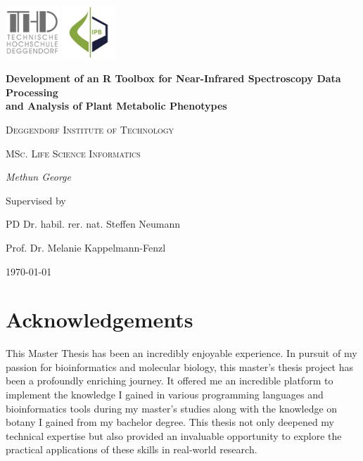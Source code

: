\documentclass[12pt,a4paper]{article}
\begin{document}
\begin{titlepage}
    \centering
    \begin{flushright}
        \centering
        \includegraphics[width=2cm]{images/thd.png} %
        \hspace{0cm} %
        \includegraphics[width=2cm]{images/ipb.jpg} %
    \end{flushright}
    {\huge\bfseries Development of an R Toolbox for Near-Infrared Spectroscopy Data Processing \\
    and Analysis of Plant Metabolic Phenotypes\par}
    \vspace{2cm}
    {\LARGE \textsc{Deggendorf Institute of Technology}\par}
    \vspace{1cm}
    {\Large \textsc{MSc. Life Science Informatics}\par}
    \vspace{1.5cm}
    {\Large\itshape Methun George\par}
    \vfill
    Supervised by\par
    PD Dr. habil. rer. nat. Steffen Neumann\par
    Prof. Dr. Melanie Kappelmann-Fenzl
    \vfill
    {\large \today\par}
\end{titlepage}

\newpage
\section*{Acknowledgements}
This Master Thesis has been an incredibly enjoyable experience. In pursuit of my passion for bioinformatics and molecular biology, this master’s thesis project has been a profoundly enriching journey. It offered me an incredible platform to implement the knowledge I gained in various programming languages and bioinformatics tools during my master’s studies along with the knowledge on botany I gained from my bachelor degree. This thesis not only deepened my technical expertise but also provided an invaluable opportunity to explore the practical applications of these skills in real-world research. \\
\end{document}
